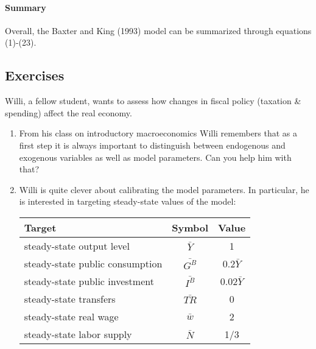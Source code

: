 \documentclass{article}
\begin{document}
\paragraph{Summary}
Overall, the Baxter and King (1993) model can be summarized through equations (1)-(23).

\newpage
\subsection*{Exercises}
Willi, a fellow student, wants to assess how changes in fiscal policy (taxation \& spending) affect the real economy.

\begin{enumerate}
  \item From his class on introductory macroeconomics Willi remembers that as a first step it is always important to distinguish between endogenous and exogenous variables as well as model parameters. Can you help him with that?
  \item Willi is quite clever about calibrating the model parameters. In particular, he is interested in targeting steady-state values of the model:
      \begin{center}
       \begin{tabular}{lcc}
         Target & Symbol & Value \\\hline
         steady-state output level          & $\bar{Y}$ & 1 \\
         steady-state public consumption    & $\bar{G^B}$ & 0.2$\bar{Y}$ \\
         steady-state public investment     & $\bar{I^B}$ & 0.02$\bar{Y}$ \\
         steady-state transfers             & $\bar{TR}$ & 0 \\
         steady-state real wage             & $\bar{w}$ & 2\\
         steady-state labor supply          & $\bar{N}$ & 1/3\\
         \hline
       \end{tabular}
        \end{center}


\end{enumerate}
\end{document}
